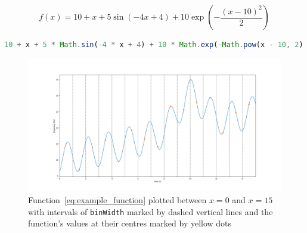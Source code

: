 \documentclass{article}
\begin{document}
\begin{equation} \label{eq:example_function}
  f(x) = 10 + x + 5\sin(-4x + 4) + 10\exp \left( -\frac{(x - 10)^2}{2} \right)
\end{equation}

\begin{lstlisting}[language=JavaScript]
10 + x + 5 * Math.sin(-4 * x + 4) + 10 * Math.exp(-Math.pow(x - 10, 2) / 2)
\end{lstlisting}


\begin{figure}
  \centering
  \includegraphics[width=\textwidth]{../plots/functional_workload.png}
  \caption{Function~\eqref{eq:example_function} plotted between $x=0$ and
    $x=15$ with intervals of \texttt{binWidth} marked by dashed vertical lines
    and the function's values at their centres marked by yellow dots}
  \label{fig:functional_workload}
\end{figure}



\end{document}
